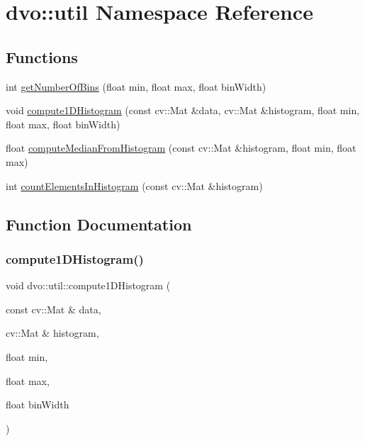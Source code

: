 \hypertarget{namespacedvo_1_1util}{}\section{dvo\+:\+:util Namespace Reference}
\label{namespacedvo_1_1util}
\subsection*{Functions}
\begin{DoxyCompactItemize}
\item 
int \mbox{\hyperlink{namespacedvo_1_1util_a3523b38b32b8f623b5aeff6e7c4339cb}{get\+Number\+Of\+Bins}} (float min, float max, float bin\+Width)
\item 
void \mbox{\hyperlink{namespacedvo_1_1util_a5a690206d2cdf3f54db9e991cfebb1c1}{compute1\+D\+Histogram}} (const cv\+::\+Mat \&data, cv\+::\+Mat \&histogram, float min, float max, float bin\+Width)
\item 
float \mbox{\hyperlink{namespacedvo_1_1util_af0fef1368b12563b7e623482aef1725a}{compute\+Median\+From\+Histogram}} (const cv\+::\+Mat \&histogram, float min, float max)
\item 
int \mbox{\hyperlink{namespacedvo_1_1util_a1978d9c686a6ed8e7d373bd922b58deb}{count\+Elements\+In\+Histogram}} (const cv\+::\+Mat \&histogram)
\end{DoxyCompactItemize}


\subsection{Function Documentation}
\mbox{\label{namespacedvo_1_1util_a5a690206d2cdf3f54db9e991cfebb1c1}} 
\subsubsection{\texorpdfstring{compute1\+D\+Histogram()}{compute1DHistogram()}}
{\footnotesize\ttfamily void dvo\+::util\+::compute1\+D\+Histogram (\begin{DoxyParamCaption}\item[{const cv\+::\+Mat \&}]{data,  }\item[{cv\+::\+Mat \&}]{histogram,  }\item[{float}]{min,  }\item[{float}]{max,  }\item[{float}]{bin\+Width }\end{DoxyParamCaption})}

